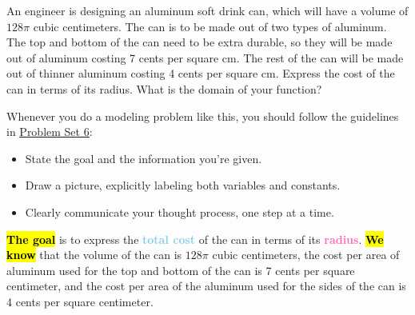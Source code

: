 \documentclass{article}
\makeatletter
\let\@href=\href
\renewcommand{\href}[2]{\@href{#1}{\ul{#2}}}
\newcommand{\goal}[1]{\textbf{\textcolor{skyblue}{#1}}}
\newcommand{\indvar}[1]{\textbf{\textcolor{hotpink}{#1}}}
\makeatother
\begin{document}
\begin{enumerate}
  \begin{problem}[\newpage]
    An engineer is designing an aluminum soft drink can, which will have a volume of $128 \pi$ cubic centimeters. The can is to be made out of two types of aluminum. The top and bottom of the can need to be extra durable, so they will be made out of aluminum costing 7 cents per square cm. The rest of the can will be made out of thinner aluminum costing 4 cents per square cm. Express the cost of the can in terms of its radius. What is the domain of your function?

    Whenever you do a modeling problem like this, you should follow the guidelines in \href{https://canvas.harvard.edu/files/20704944/download?download_frd=1}{Problem Set 6}:
    \begin{itemize}[nosep]
    \item State the goal and the information you're given.
    \item Draw a picture, explicitly labeling both variables and constants.
    \item Clearly communicate your thought process, one step at a time. 
    \end{itemize}
  \end{problem}

  \begin{solution}
    \hl{\textbf{The goal}} is to express the \goal{total cost} of the can in terms of its \indvar{radius}.
    \hl{\textbf{We know}} that the volume of the can is $128\pi$ cubic centimeters, 
    the cost per area of aluminum used for the top and bottom of the can is 7 cents per square centimeter, 
    and the cost per area of the aluminum used for the sides of the can is 4 cents per square centimeter. 


\end{solution}
\end{enumerate}
\end{document}
